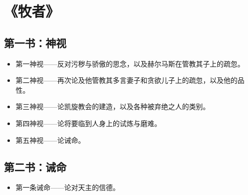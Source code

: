 
\chapter{《牧者》}



\section{第一书：神视}

\begin{itemize}
\item 第一神视——反对污秽与骄傲的思念，以及赫尔马斯在管教其子上的疏忽。
\end{itemize}

\begin{itemize}
\item 第二神视——再次论及他管教其多言妻子和贪欲儿子上的疏忽，以及他的品性。
\end{itemize}

\begin{itemize}
\item 第三神视——论凯旋教会的建造，以及各种被弃绝之人的类别。
\end{itemize}

\begin{itemize}
\item 第四神视——论将要临到人身上的试炼与磨难。
\end{itemize}

\begin{itemize}
\item 第五神视——论诫命。
\end{itemize}


\section{第二书：诫命}

\begin{itemize}
\item 第一条诫命——论对天主的信德。
\end{itemize}

